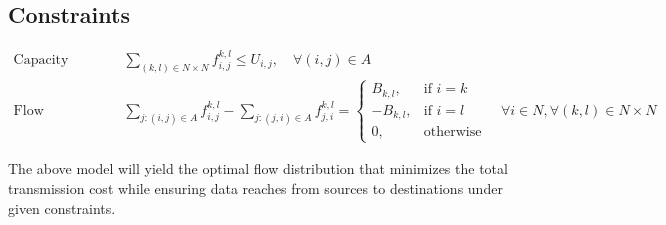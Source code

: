 \documentclass{article}
\begin{document}
\subsection*{Constraints}
\begin{align*}
\text{Capacity Constraints:} \quad & \sum_{(k,l) \in N \times N} f_{i,j}^{k,l} \leq U_{i,j}, \quad \forall (i,j) \in A \\
\text{Flow Conservation:} \quad & \sum_{j : (i,j) \in A} f_{i,j}^{k,l} - \sum_{j : (j,i) \in A} f_{j,i}^{k,l} = 
\begin{cases} 
B_{k,l}, & \text{if } i = k \\ 
-B_{k,l}, & \text{if } i = l \\ 
0, & \text{otherwise} 
\end{cases} \quad \forall i \in N, \forall (k,l) \in N \times N
\end{align*}

The above model will yield the optimal flow distribution that minimizes the total transmission cost while ensuring data reaches from sources to destinations under given constraints.
\end{document}
